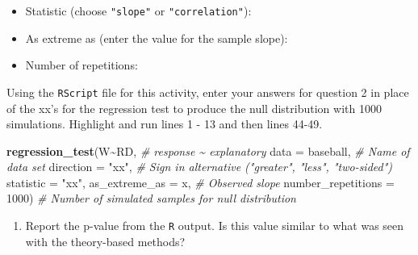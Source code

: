 \documentclass[
]{report}
\newenvironment{Shaded}{\begin{snugshade}}{\end{snugshade}}
\newcommand{\CommentTok}[1]{\textcolor[rgb]{0.56,0.35,0.01}{\textit{#1}}}
\newcommand{\DataTypeTok}[1]{\textcolor[rgb]{0.13,0.29,0.53}{#1}}
\newcommand{\DecValTok}[1]{\textcolor[rgb]{0.00,0.00,0.81}{#1}}
\newcommand{\KeywordTok}[1]{\textcolor[rgb]{0.13,0.29,0.53}{\textbf{#1}}}
\newcommand{\NormalTok}[1]{#1}
\newcommand{\OperatorTok}[1]{\textcolor[rgb]{0.81,0.36,0.00}{\textbf{#1}}}
\newcommand{\StringTok}[1]{\textcolor[rgb]{0.31,0.60,0.02}{#1}}
\providecommand{\tightlist}{%
  \setlength{\itemsep}{0pt}\setlength{\parskip}{0pt}}
\begin{document}
\vspace{.2in}

\begin{itemize}
\tightlist
\item
  Statistic (choose \texttt{"slope"} or \texttt{"correlation"}):
\end{itemize}

\vspace{.2in}

\begin{itemize}
\tightlist
\item
  As extreme as (enter the value for the sample slope):
\end{itemize}

\vspace{0.2in}

\begin{itemize}
\tightlist
\item
  Number of repetitions:
\end{itemize}

\vspace{.2in}

Using the \texttt{RScript} file for this activity, enter your answers for question 2 in place of the xx's for the regression test to produce the null distribution with 1000 simulations. Highlight and run lines 1 - 13 and then lines 44-49.

\begin{Shaded}
\begin{Highlighting}[]
\KeywordTok{regression\_test}\NormalTok{(W}\OperatorTok{\textasciitilde{}}\NormalTok{RD, }\CommentTok{\# response \textasciitilde{} explanatory}
               \DataTypeTok{data =}\NormalTok{ baseball, }\CommentTok{\# Name of data set}
               \DataTypeTok{direction =} \StringTok{"xx"}\NormalTok{, }\CommentTok{\# Sign in alternative ("greater", "less", "two{-}sided")}
               \DataTypeTok{statistic =} \StringTok{"xx"}\NormalTok{, }
               \DataTypeTok{as\_extreme\_as =}\NormalTok{ x, }\CommentTok{\# Observed slope}
               \DataTypeTok{number\_repetitions =} \DecValTok{1000}\NormalTok{) }\CommentTok{\# Number of simulated samples for null distribution}
       
\end{Highlighting}
\end{Shaded}

\begin{enumerate}
\def\labelenumi{\arabic{enumi}.}
\setcounter{enumi}{2}
\tightlist
\item
  Report the p-value from the \texttt{R} output. Is this value similar to what was seen with the theory-based methods?
\end{enumerate}
\end{document}
